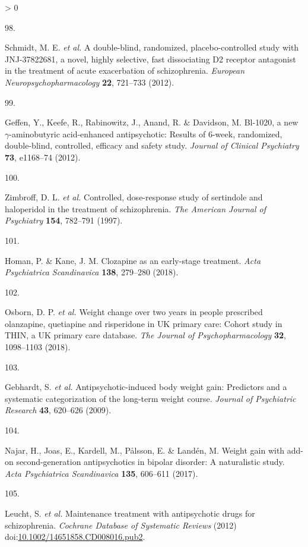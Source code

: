 \documentclass[
  9pt,
  english,
  ,jou,floatsintext]{apa6}
\newlength{\cslhangindent}
\newlength{\csllabelwidth}
\newenvironment{CSLReferences}[2] %
 {%
  \setlength{\parindent}{0pt}
  \ifodd #1 \everypar{\setlength{\hangindent}{\cslhangindent}}\ignorespaces\fi
  \ifnum #2 > 0
  \setlength{\parskip}{#2\baselineskip}
  \fi
 }%
 {}
\newcommand{\CSLLeftMargin}[1]{\parbox[t]{\csllabelwidth}{#1}}
\newcommand{\CSLRightInline}[1]{\parbox[t]{\linewidth - \csllabelwidth}{#1}\break}
\begin{document}
\begin{CSLReferences}{0}{0}
\leavevmode\hypertarget{ref-Schmidt2014}{}%
\CSLLeftMargin{98. }
\CSLRightInline{Schmidt, M. E. \emph{et al.} A double-blind, randomized, placebo-controlled study with JNJ-37822681, a novel, highly selective, fast dissociating D2 receptor antagonist in the treatment of acute exacerbation of schizophrenia. \emph{European Neuropsychopharmacology} \textbf{22}, 721--733 (2012).}

\leavevmode\hypertarget{ref-Geffen2012}{}%
\CSLLeftMargin{99. }
\CSLRightInline{Geffen, Y., Keefe, R., Rabinowitz, J., Anand, R. \& Davidson, M. Bl-1020, a new \(\gamma\)-aminobutyric acid-enhanced antipsychotic: Results of 6-week, randomized, double-blind, controlled, efficacy and safety study. \emph{Journal of Clinical Psychiatry} \textbf{73}, e1168--74 (2012).}

\leavevmode\hypertarget{ref-Zimbroff1997}{}%
\CSLLeftMargin{100. }
\CSLRightInline{Zimbroff, D. L. \emph{et al.} Controlled, dose-response study of sertindole and haloperidol in the treatment of schizophrenia. \emph{The American Journal of Psychiatry} \textbf{154}, 782--791 (1997).}

\leavevmode\hypertarget{ref-Homan2018}{}%
\CSLLeftMargin{101. }
\CSLRightInline{Homan, P. \& Kane, J. M. Clozapine as an early-stage treatment. \emph{Acta Psychiatrica Scandinavica} \textbf{138}, 279--280 (2018).}

\leavevmode\hypertarget{ref-Osborn2018}{}%
\CSLLeftMargin{102. }
\CSLRightInline{Osborn, D. P. \emph{et al.} Weight change over two years in people prescribed olanzapine, quetiapine and risperidone in {UK} primary care: {Cohort} study in {THIN}, a {UK} primary care database. \emph{The Journal of Psychopharmacology} \textbf{32}, 1098--1103 (2018).}

\leavevmode\hypertarget{ref-Gebhardt2009}{}%
\CSLLeftMargin{103. }
\CSLRightInline{Gebhardt, S. \emph{et al.} Antipsychotic-induced body weight gain: {Predictors} and a systematic categorization of the long-term weight course. \emph{Journal of Psychiatric Research} \textbf{43}, 620--626 (2009).}

\leavevmode\hypertarget{ref-Najar2017}{}%
\CSLLeftMargin{104. }
\CSLRightInline{Najar, H., Joas, E., Kardell, M., Pålsson, E. \& Landén, M. Weight gain with add-on second-generation antipsychotics in bipolar disorder: A naturalistic study. \emph{Acta Psychiatrica Scandinavica} \textbf{135}, 606--611 (2017).}

\leavevmode\hypertarget{ref-Leucht2012a}{}%
\CSLLeftMargin{105. }
\CSLRightInline{Leucht, S. \emph{et al.} Maintenance treatment with antipsychotic drugs for schizophrenia. \emph{Cochrane Database of Systematic Reviews} (2012) doi:\href{https://doi.org/10.1002/14651858.CD008016.pub2}{10.1002/14651858.CD008016.pub2}.}


\end{CSLReferences}
\end{document}
